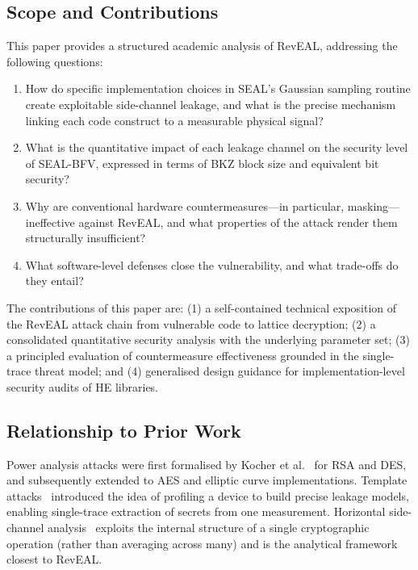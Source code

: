 \documentclass[sigconf,nonacm]{acmart}
\begin{document}
\subsection{Scope and Contributions}

This paper provides a structured academic analysis of RevEAL, addressing the
following questions:

\begin{enumerate}
  \item How do specific implementation choices in SEAL's Gaussian sampling routine
        create exploitable side-channel leakage, and what is the precise mechanism
        linking each code construct to a measurable physical signal?
  \item What is the quantitative impact of each leakage channel on the security level
        of SEAL-BFV, expressed in terms of BKZ block size and equivalent bit security?
  \item Why are conventional hardware countermeasures---in particular, masking---
        ineffective against RevEAL, and what properties of the attack render them
        structurally insufficient?
  \item What software-level defenses close the vulnerability, and what trade-offs do
        they entail?
\end{enumerate}

The contributions of this paper are: (1) a self-contained technical exposition of
the RevEAL attack chain from vulnerable code to lattice decryption; (2) a
consolidated quantitative security analysis with the underlying parameter set; (3) a
principled evaluation of countermeasure effectiveness grounded in the single-trace
threat model; and (4) generalised design guidance for implementation-level security
audits of HE libraries.

\subsection{Relationship to Prior Work}

Power analysis attacks were first formalised by Kocher et al.~\cite{kocher1999} for
RSA and DES, and subsequently extended to AES and elliptic curve implementations.
Template attacks~\cite{chari2002} introduced the idea of profiling a device to
build precise leakage models, enabling single-trace extraction of secrets from one
measurement. Horizontal side-channel analysis~\cite{walter2001} exploits the internal
structure of a single cryptographic operation (rather than averaging across many)
and is the analytical framework closest to RevEAL.
\end{document}
